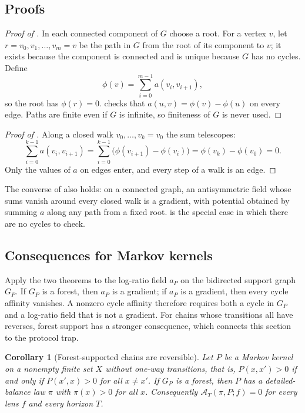 \documentclass[11pt]{article}
\newtheorem{corollary}{Corollary}[section]
\theoremstyle{definition}
\newcommand{\1}{\mathbf{1}}
\newcommand{\thmNGForceForest}{\Cref{thm:NG_FORCE_FOREST}}
\newcommand{\thmNGForceNull}{\Cref{thm:NG_FORCE_NULL}}
\newcommand{\Arr}{\mathcal{A}}
\begin{document}
\subsection{Proofs}

\begin{proof}[Proof of ]
In each connected component of $G$ choose a root.
For a vertex $v$, let $r=v_0,v_1,\dots,v_m=v$ be the path in $G$ from the root of its component to $v$; it exists because the component is connected and is unique because $G$ has no cycles.
Define
\[
  \phi(v)=\sum_{i=0}^{m-1}a(v_i,v_{i+1}),
\]
so the root has $\phi(r)=0$.
 checks that $a(u,v)=\phi(v)-\phi(u)$ on every edge.
Paths are finite even if $G$ is infinite, so finiteness of $G$ is never used.
\end{proof}

\begin{proof}[Proof of ]
Along a closed walk $v_0,\dots,v_k=v_0$ the sum telescopes:
\[
  \sum_{i=0}^{k-1}a(v_i,v_{i+1})=\sum_{i=0}^{k-1}\bigl(\phi(v_{i+1})-\phi(v_i)\bigr)=\phi(v_k)-\phi(v_0)=0.
\]
Only the values of $a$ on edges enter, and every step of a walk is an edge.
\end{proof}

The converse of \thmNGForceNull{} also holds: on a connected graph, an antisymmetric field whose sums vanish around every closed walk is a gradient, with potential obtained by summing $a$ along any path from a fixed root.
\thmNGForceForest{} is the special case in which there are no cycles to check.

\subsection{Consequences for Markov kernels}

Apply the two theorems to the log-ratio field $a_P$ on the bidirected support graph $G_P$.
If $G_P$ is a forest, then $a_P$ is a gradient; if $a_P$ is a gradient, then every cycle affinity vanishes.
A nonzero cycle affinity therefore requires both a cycle in $G_P$ and a log-ratio field that is not a gradient.
For chains whose transitions all have reverses, forest support has a stronger consequence, which connects this section to the protocol trap.

\begin{corollary}[Forest-supported chains are reversible]\label{cor:forest_reversible}
Let $P$ be a Markov kernel on a nonempty finite set $X$ without one-way transitions, that is, $P(x,x')>0$ if and only if $P(x',x)>0$ for all $x\ne x'$.
If $G_P$ is a forest, then $P$ has a detailed-balance law $\pi$ with $\pi(x)>0$ for all $x$.
Consequently $\Arr_T(\pi,P;f)=0$ for every lens $f$ and every horizon $T$.
\end{corollary}
\end{document}
